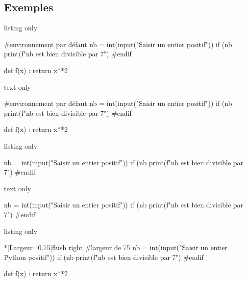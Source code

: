 \subsection{Exemples}

\begin{PresCodeTexPL}{listing only}
\begin{CodePythonLst}{} %
#environnement par défaut
nb = int(input("Saisir un entier positif"))
if (nb %
	print(f"{nb} est bien divisible par 7")
#endif

def f(x) :
	return x**2
\end{CodePythonLst}
\end{PresCodeTexPL}

\begin{PresCodeSortiePL}{text only}
\begin{CodePythonLst}{}
#environnement par défaut
nb = int(input("Saisir un entier positif"))
if (nb %
	print(f"{nb} est bien divisible par 7")
#endif

def f(x) :
	return x**2
\end{CodePythonLst}
\end{PresCodeSortiePL}

\begin{PresCodeTexPL}{listing only}
\begin{CodePythonLst}[PremLigne=10]{}
nb = int(input("Saisir un entier positif"))
if (nb %
	print(f"{nb} est bien divisible par 7")
#endif
\end{CodePythonLst}
\end{PresCodeTexPL}

\begin{PresCodeSortiePL}{text only}
\begin{CodePythonLst}[PremLigne=10]{}
nb = int(input("Saisir un entier positif"))
if (nb %
	print(f"{nb} est bien divisible par 7")
#endif
\end{CodePythonLst}
\end{PresCodeSortiePL}

\begin{PresCodeTexPL}{listing only}
\begin{CodePythonLstAlt}*[Largeur=0.75\linewidth]{flush right}
#largeur de 75%
nb = int(input("Saisir un entier Python positif"))
if (nb %
	print(f"{nb} est bien divisible par 7")
#endif

def f(x) :
	return x**2
\end{CodePythonLstAlt}
\end{PresCodeTexPL}

